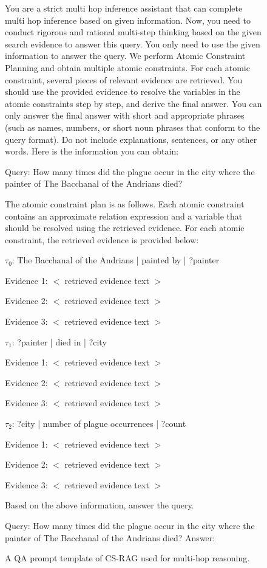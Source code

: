 \documentclass{article}
\theoremstyle{plain}
\theoremstyle{definition}
\theoremstyle{remark}
\begin{document}
\begin{figure}[ht]
    \centering
    
    \begin{fullwidthprompt}
You are a strict multi hop inference assistant that can complete multi hop inference based on given information.
Now, you need to conduct rigorous and rational multi-step thinking based on the given search evidence to answer this query. You only need to use the given information to answer the query.
We perform Atomic Constraint Planning and obtain multiple atomic constraints. For each atomic constraint, several pieces of relevant evidence are retrieved. You should use the provided evidence to resolve the variables in the atomic constraints step by step, and derive the final answer.
You can only answer the final answer with short and appropriate phrases (such as names, numbers, or short noun phrases that conform to the query format). Do not include explanations, sentences, or any other words.
Here is the information you can obtain:

Query: How many times did the plague occur in the city where the painter of The Bacchanal of the Andrians died?

The atomic constraint plan is as follows. Each atomic constraint contains an approximate relation expression and a variable that should be resolved using the retrieved evidence. For each atomic constraint, the retrieved evidence is provided below:

$\tau_0$: The Bacchanal of the Andrians | painted by | ?painter
  
     
     Evidence 1: $<$ retrieved evidence text $>$ 
     
    Evidence 2: $<$ retrieved evidence text $>$ 
    
    Evidence 3: $<$ retrieved evidence text $>$  

$\tau_1$: ?painter | died in | ?city
 
    
    Evidence 1: $<$ retrieved evidence text $>$ 
    
        Evidence 2: $<$ retrieved evidence text $>$  
        
    Evidence 3: $<$ retrieved evidence text $>$  

$\tau_2$: ?city | number of plague occurrences | ?count
 
    
    Evidence 1: $<$ retrieved evidence text $>$ 
    
        Evidence 2: $<$ retrieved evidence text $>$  
        
    Evidence 3: $<$ retrieved evidence text $>$  
    

Based on the above information, answer the query.

Query: How many times did the plague occur in the city where the painter of The Bacchanal of the Andrians died? Answer:
    \end{fullwidthprompt}
    \caption{A QA prompt template of CS-RAG used for multi-hop reasoning.}
    \label{fig:prompt_example}
\end{figure}




\end{document}

